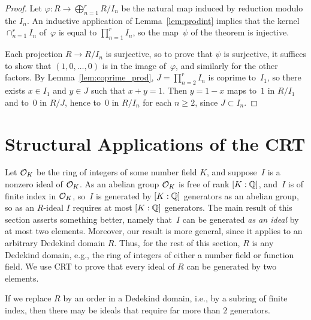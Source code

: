 \begin{proof}
Let
$
  \varphi:R \to \bigoplus_{n=1}^r R/I_n
$
be the natural map induced by reduction modulo
the $I_n$.
An inductive application of Lemma~\ref{lem:prodint}
implies that
the kernel $\cap_{n=1}^r I_n$ of~$\varphi$
is equal to
$\prod_{n=1}^r I_n$, so the map~$\psi$ of the theorem is injective.

Each projection $R\to R/I_n$ is  surjective, so to prove
that $\psi$ is surjective, it suffices
to show that $(1,0, \dots,0)$
is in the image of~$\varphi$, and similarly for the other
factors.  By Lemma~\ref{lem:coprime_prod},
$J=\prod_{n=2}^rI_n$ is coprime to~$I_1$, so
there exists $x\in I_1$ and $y \in J$ such that
$x+y=1$.  Then $y = 1-x$ maps to~$1$ in
$R/I_1$ and to~$0$ in $R/J$, hence to~$0$ in $R/I_n$
for each $n\geq 2$, since $J\subset I_n$.
\end{proof}

\section{Structural Applications of the CRT}
Let $\mathcal{O}_K$ be the ring of integers of some number field $K$, and
suppose~$I$ is a nonzero ideal of $\mathcal{O}_K$.  As an abelian group $\mathcal{O}_K$
is free of rank $[K:\mathbb{Q}]$, and~$I$ is of finite index in $\mathcal{O}_K$, so~$I$
is generated by $[K:\mathbb{Q}]$ generators as an abelian group, so as an
$R$-ideal $I$ requires at most $[K:\mathbb{Q}]$ generators.  The main result
of this section asserts something better, namely that~$I$ can be
generated {\em as an ideal} by at most two elements.  Moreover, our
result is more general, since it applies to an arbitrary Dedekind
domain $R$. Thus, for the rest of this section, $R$ is any Dedekind
domain, e.g., the ring of integers of either a number field or
function field.  We use CRT to prove that every ideal of $R$ can be
generated by two elements.

\begin{warning}
If we replace $R$ by an order in a Dedekind domain, i.e.,
by a subring of finite index, then there may be ideals that
require far more than $2$ generators.
\end{warning}

